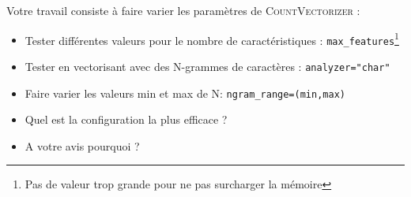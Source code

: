 Votre travail consiste à faire varier les paramètres de \textsc{CountVectorizer} :
\begin{itemize}
  \item Tester différentes valeurs pour le nombre de caractéristiques : \texttt{max\_features}\footnote{Pas de valeur trop grande pour ne pas surcharger la mémoire}
  \item Tester en vectorisant avec des N-grammes de caractères : \texttt{analyzer="char"}
  \item Faire varier les valeurs min et max de N:  \texttt{ngram\_range=(min,max)}
  \item Quel est la configuration la plus efficace ?
  \item A votre avis pourquoi ?
\end{itemize}
